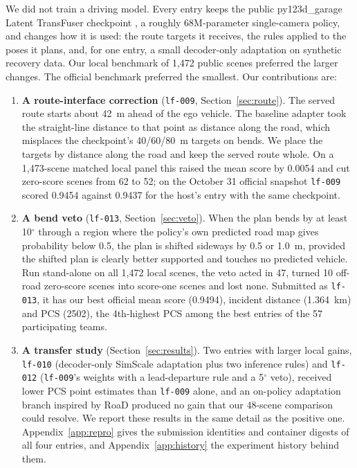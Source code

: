 \documentclass{article}
\newcommand{\lf}{\texttt{lf-009}}
\begin{document}
We did not train a driving model. Every entry keeps the public py123d\_garage Latent TransFuser checkpoint \cite{garage,weights,py123d}, a roughly 68M-parameter single-camera policy, and changes how it is used: the route targets it receives, the rules applied to the poses it plans, and, for one entry, a small decoder-only adaptation on synthetic recovery data. Our local benchmark of 1,472 public scenes preferred the larger changes. The official benchmark preferred the smallest. Our contributions are:
\begin{enumerate}
\item \textbf{A route-interface correction} (\lf{}, Section~\ref{sec:route}). The served route starts about 42~m ahead of the ego vehicle. The baseline adapter took the straight-line distance to that point as distance along the road, which misplaces the checkpoint's 40/60/80~m targets on bends. We place the targets by distance along the road and keep the served route whole. On a 1,473-scene matched local panel this raised the mean score by 0.0054 and cut zero-score scenes from 62 to 52; on the October 31 official snapshot \lf{} scored 0.9454 against 0.9437 for the host's entry with the same checkpoint.
\item \textbf{A bend veto} (\texttt{lf-013}, Section~\ref{sec:veto}). When the plan bends by at least 10$^\circ$ through a region where the policy's own predicted road map gives probability below 0.5, the plan is shifted sideways by 0.5 or 1.0~m, provided the shifted plan is clearly better supported and touches no predicted vehicle. Run stand-alone on all 1,472 local scenes, the veto acted in 47, turned 10 off-road zero-score scenes into score-one scenes and lost none. Submitted as \texttt{lf-013}, it has our best official mean score (0.9494), incident distance (1.364~km) and PCS (2502), the 4th-highest PCS among the best entries of the 57 participating teams.
\item \textbf{A transfer study} (Section~\ref{sec:results}). Two entries with larger local gains, \texttt{lf-010} (decoder-only SimScale adaptation plus two inference rules) and \texttt{lf-012} (\lf{}'s weights with a lead-departure rule and a 5$^\circ$ veto), received lower PCS point estimates than \lf{} alone, and an on-policy adaptation branch inspired by RoaD produced no gain that our 48-scene comparison could resolve. We report these results in the same detail as the positive one. Appendix~\ref{app:repro} gives the submission identities and container digests of all four entries, and Appendix~\ref{app:history} the experiment history behind them.
\end{enumerate}
\end{document}
